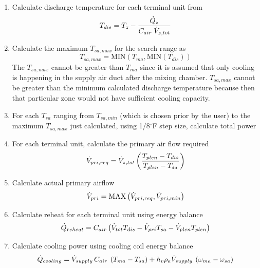 \begin{enumerate}
    \item Calculate discharge temperature for each terminal unit from 
        \begin{equation}
            T_{dis}=T_{z} - \frac{\dot{Q}_{z}}{C_{air} \; \dot{V}_{z,tot}  }   
        \end{equation}
    \item Calculate the maximum \(T_{sa,max}\) for the search range as 
        \begin{equation}
            T_{sa,max}  = \text{MIN}\left(T_{ma}, \text{MIN}(T_{dis}) \right)
        \end{equation}
        The \(T_{sa,max}\) cannot be greater than \(T_{ma}\) since it is
        assumed that only cooling is happening in the supply air duct
        after the mixing chamber. \(T_{sa,max}\) cannot be greater than
        the minimum calculated discharge temperature because then that
        particular zone would not have sufficient cooling capacity. 
    \item For each \(T_{sa}\) ranging from \(T_{sa,min}\) (which is
        chosen prior by the user) to the maximum \(T_{sa,max}\) just
        calculated, using 1/8\(^{\circ}\)F step size, calculate total
        power
    \item For each terminal unit, calculate the primary air flow required
    \begin{equation} \dot{V}_{pri, req} = \dot{V}_{z,tot} \left( \frac{T_{plen} - T_{dis} }{T_{plen} - T_{sa}} \right) \end{equation}
    \item Calculate actual primary airflow
        \begin{equation}\label{eq:PrimaryFlowRequired}
            \dot{V}_{pri} = \text{MAX}\left(\dot{V}_{pri,req}, \dot{V}_{pri,min}  \right)
        \end{equation}
    \item Calculate reheat for each terminal unit using energy balance
        \begin{equation}\label{eq:reheatPerZone}
            \dot{Q}_{reheat} = C_{air} \left(\dot{V}_{tot} T_{dis} - \dot{V}_{pri} T_{sa} - \dot{V}_{plen} T_{plen}\right)  
        \end{equation}
    \item Calculate cooling power using cooling coil energy balance
        \begin{equation}\label{eq:TotalCoolingPower}
            {\dot Q_{cooling}} = {\flow{supply}}\,\heatCapacity\:\left( {{T_{ma}} - {\sat}} \right) + h_v\rho_a{\flow{supply}}\:\left( {{\omega _{ma}} - {\omega _{sa}}} \right)

\end{equation}
\end{enumerate}
